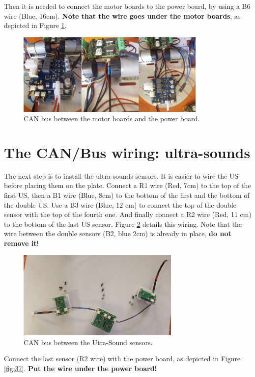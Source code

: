 \documentclass[10pt,a4paper]{report}   %
\begin{document}
Then it is needed to connect the motor boards to the power board, by using a B6 wire (Blue, 16cm). \textbf{Note that the wire goes under the motor boards}, as depicted in Figure \ref{fig:35}.

\begin{figure}[H]
\center
\includegraphics[width=350px]{images/35.jpg}
\caption{CAN bus between the motor boards and the power board.}
\label{fig:35}
\end{figure}

\section{The CAN/Bus wiring: ultra-sounds}

The next step is to install the ultra-sounds sensors. It is easier to wire the US before placing them on the plate. Connect a R1 wire (Red, 7cm) to the top of the first US, then a B1 wire (Blue, 8cm) to the bottom of the first and the bottom of the double US. Use a B3 wire (Blue, 12 cm) to connect the top of the double sensor with the top of the fourth one. And finally connect a R2 wire (Red, 11 cm) to the bottom of the last US sensor. Figure \ref{fig:36} details this wiring. Note that the wire between the double sensors (B2, blue 2cm) is already in place, \textbf{do not remove it}!

\begin{figure}[H]
\center
\includegraphics[width=300px]{images/36.jpg}
\caption{CAN bus between the Utra-Sound sensors.}
\label{fig:36}
\end{figure}

Connect the last sensor (R2 wire) with the power board, as depicted in Figure \ref{fig:37}. \textbf{Put the wire under the power board!} 
\end{document}
